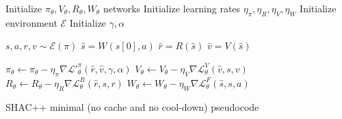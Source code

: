\begin{algorithm}[t]
    \begin{algorithmic}[1]
    \STATE Initialize $\pi_\theta,V_\theta,R_\theta,W_\theta$ networks
    \STATE Initialize learning rates $\eta_\pi, \eta_R, \eta_V, \eta_W$
    \STATE Initialize environment $\mathcal{E}$
    \STATE Initialize $\gamma, \alpha$
    
        
        \STATE $s,a,r,v \sim \mathcal{E}(\pi)$
        \STATE $\hat{s} = W(s[0], a)$
        \STATE $\hat{r} = R(\hat{s})$
        \STATE $\hat{v} = V(\hat{s})$
        
        \STATE $\pi_\theta \gets \pi_\theta - \eta_\pi \nabla \mathcal{L'}^\pi_\theta(\hat{r},\hat{v},\gamma,\alpha)$
        \STATE $V_\theta \gets V_\theta - \eta_V \nabla \mathcal{L}^V_\theta(\hat{v},s,v)$
        \STATE $R_\theta \gets R_\theta - \eta_R \nabla \mathcal{L}^R_\theta(\hat{r},s,r)$
        \STATE $W_\theta \gets W_\theta - \eta_W \nabla \mathcal{L}^F_\theta(\hat{s},s,a)$
    
    \ENDFOR
    
    \end{algorithmic}
    \label{alg:shacpp}
    \caption{SHAC++ minimal (no cache and no cool-down) pseudocode}
\end{algorithm}


